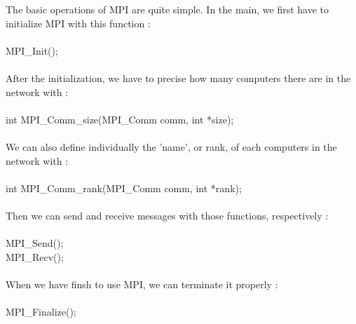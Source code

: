 The basic operations of MPI are quite simple. In the main, we first have to initialize MPI with this function :\\\\
MPI\_Init();\\\\
After the initialization, we have to precise how many computers there are in the network with :\\\\
int MPI\_Comm\_size(MPI\_Comm comm, int *size);\\\\
We can also define individually the 'name', or rank, of each computers in the network with :\\\\
int MPI\_Comm\_rank(MPI\_Comm comm, int *rank);\\\\
Then we can send and receive messages with those functions, respectively :\\\\
MPI\_Send();\\
MPI\_Recv();\\\\
When we have finsh to use MPI, we can terminate it properly :\\\\
MPI\_Finalize();\\